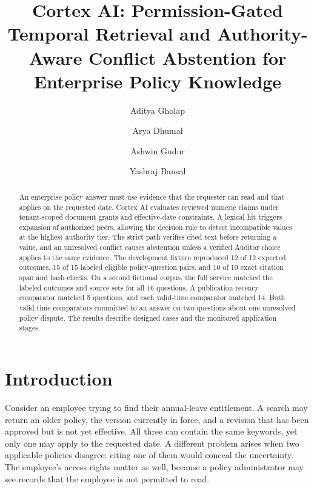 \documentclass[runningheads]{llncs}
\begin{document}
\title{Cortex AI: Permission-Gated Temporal Retrieval and
Authority-Aware Conflict Abstention for Enterprise Policy Knowledge}
\author{Aditya Gholap \and Arya Dhumal \and Ashwin Gudur \and Yashraj
Bansal}
\maketitle
\begin{abstract}
An enterprise policy answer must use evidence that the requester can
read and that applies on the requested date. Cortex AI evaluates
reviewed numeric claims under tenant-scoped document grants and
effective-date constraints. A lexical hit triggers expansion of
authorized peers, allowing the decision rule to detect incompatible
values at the highest authority tier. The strict path verifies cited
text before returning a value, and an unresolved conflict causes
abstention unless a verified Auditor choice applies to the same
evidence. The development fixture reproduced 12 of 12 expected outcomes,
15 of 15 labeled eligible policy-question pairs, and 10 of 10 exact
citation span and hash checks. On a second fictional corpus, the full
service matched the labeled outcomes and source sets for all 16
questions. A publication-recency comparator matched 5 questions, and
each valid-time comparator matched 14. Both valid-time comparators
committed to an answer on two questions about one unresolved policy
dispute. The results describe designed cases and the monitored
application stages.
\end{abstract}
\section{Introduction}\label{introduction}

Consider an employee trying to find their annual-leave entitlement. A
search may return an older policy, the version currently in force, and a
revision that has been approved but is not yet effective. All three can
contain the same keywords, yet only one may apply to the requested date.
A different problem arises when two applicable policies disagree: citing
one of them would conceal the uncertainty. The employee's access rights
matter as well, because a policy administrator may see records that the
employee is not permitted to read.
\end{document}
